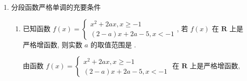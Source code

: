 \begin{enumerate}
    \begin{enumerate}
        \item 定义在 $(0,+\infty)$ 上的函数 $f(x)$ 满足 $\frac{x_{2} f\left(x_{1}\right)-x_{1} f\left(x_{2}\right)}{x_{1}-x_{2}}<0$, 且 $f(3)=9$, 则使 $f(x)>3 x$ 成立的 $x$ 的取值范围是 .
        \begin{jieda}
        由 $\frac{x_{2} f\left(x_{1}\right)-x_{1} f\left(x_{2}\right)}{x_{1}-x_{2}}<0$, 且 $x_{1}, x_{2} \in(0,+\infty)$, 则两边同时除以 $x_{1} x_{2}$ 可得 $\frac{\frac{f\left(x_{1}\right)}{x_{1}}-\frac{f\left(x_{2}\right)}{x_{2}}}{x_{1}-x_{2}}<0$,
        令 $g(x)=\frac{f(x)}{x}$, 则原不等式为 $\frac{g\left(x_{1}\right)-g\left(x_{2}\right)}{x_{1}-x_{2}}<0$, 因此函数 $g(x)$ 在 $(0,+\infty)$ 上严格减,由 $f(x)>3 x$, 得 $\frac{f(x)}{x}>3$, 又 $g(3)=\frac{f(3)}{3}=3$, 于是 $g(x)>g(3)$, 解得 $0<x<3$,所以使 $f(x)>3 x$ 成立的 $x$ 的取值范围是 $(0,3)$. \\
        \ps $\frac{f(x_1) - f(x_2)}{x_1 - x_2}$的几何意义是割线的斜率，遇到接近$\frac{f(x_1) - f(x_2)}{x_1 - x_2}$的情况，可以凑出割线斜率的形式，若割线斜率恒大于零则函数在对应区间上严格增.
        \end{jieda}
        \item 函数$f(x)$为定义在$(-\infty, 0) \cup (0, +\infty)$上的奇函数，$f(2) = 1$，对于任意$x_1, x_2 \in (0, +\infty), x_1 \neq x_2$，都有$\frac{x_1f(x_1) - x_2f(x_2)}{x_1 - x_2} > 0$成立，则$f(x) \leq \frac{2}{x}$的解集为\blkda[3]{$(-\infty， -2] \cup (0, 2]$}.
        \item 设奇函数$f(x)$在$(0, +\infty)$上为增函数，且$f(1) = 0$，则不等式$\frac{f(x) - f(-x)}{x} < 0$的解集为.
    \end{enumerate}
    \item 分段函数严格单调的充要条件
    \begin{enumerate}
        \item 已知函数 $f(x)=\left\{\begin{array}{l}x^{2}+2 a x, x \geq-1 \\ (2-a) x+2 a-5, x<-1\end{array}\right.$, 若 $f(x)$ 在 $\mathbf{R}$ 上是严格增函数, 则实数 $a$ 的取值范围是 .
        \begin{jieda} 由函数 $f(x)=\left\{\begin{array}{l}x^{2}+2 a x, x \geq-1 \\ (2-a) x+2 a-5, x<-1\end{array}\right.$ 在 $\mathbf{R}$ 上是严格增函数, \\

\end{jieda}
\end{enumerate}
\end{enumerate}
